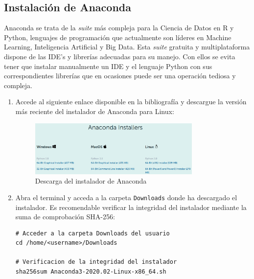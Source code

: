 \subsection{Instalación de Anaconda}
\label{subsec:instalacion-anaconda}

Anaconda se trata de la \textit{suite} más compleja para la Ciencia de Datos en R y Python, lenguajes de programación que actualmente son líderes en Machine Learning, Inteligencia Artificial y Big Data. Esta \textit{suite} gratuita y multiplataforma dispone de las IDE's y librerías adecuadas para su manejo. Con ellos se evita tener que instalar manualmente un IDE y el lenguaje Python con sus correspondientes librerías que en ocasiones puede ser una operación tediosa y compleja.

\begin{enumerate}
    
\item Accede al siguiente enlace \cite{inst-conda} disponible en la bibliografía y descargue la versión más reciente del instalador de Anaconda para Linux:

\begin{figure}[ht]
\centering
\includegraphics[width=0.8\textwidth]{img/appendix/C/anaconda-installer.png}
\caption{\label{fig:anaconda-download}Descarga del instalador de Anaconda}
\end{figure}

\item Abra el terminal y acceda a la carpeta \texttt{Downloads} donde ha descargado el instalador. Es recomendable verificar la integridad del instalador mediante la suma de comprobación SHA-256:
\vspace{0.5cm}
\begin{lstlisting}[language=iPython,caption=Verificación de la integridad de la instalación de Anaconda,captionpos=b,label={lst:verificar-sha256}]
# Acceder a la carpeta Downloads del usuario
cd /home/<username>/Downloads

# Verificacion de la integridad del instalador
sha256sum Anaconda3-2020.02-Linux-x86_64.sh
\end{lstlisting}


\end{enumerate}
